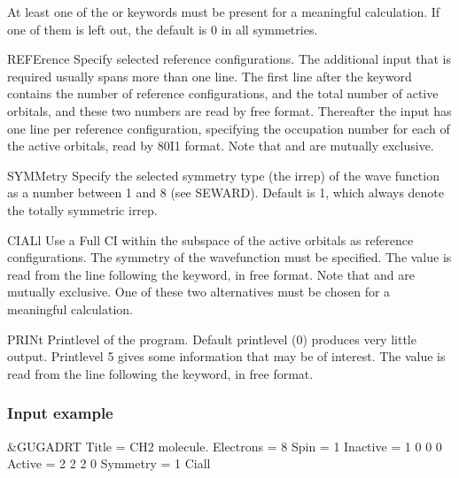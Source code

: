 \begin{keywordlist}
At least one of the  or  keywords must
be present for a meaningful calculation. If one of them is left out,
the default is 0 in all symmetries.
\item[REFErence]
Specify selected reference configurations. The additional input
that is required usually spans more than one line. The first line
after the keyword contains the number of reference configurations, and
the total number of active orbitals, and these two numbers are
read by free format. Thereafter the input has one line per
reference configuration, specifying the occupation number for each of
the active orbitals, read by 80I1 format. Note that
 and  are mutually exclusive.
\item[SYMMetry]
Specify the selected symmetry type (the irrep) of the wave function
as a number between 1 and 8 (see SEWARD). Default is 1, which
always denote the totally symmetric irrep.
\item[CIALl]
Use a Full CI within the subspace of the active orbitals as
reference configurations. The symmetry of the wavefunction must be
specified. The value is read from the line following the keyword, in
free format. Note that
 and  are mutually exclusive.
One of these two alternatives must be chosen for a meaningful calculation.
\item[PRINt]
Printlevel of the program. Default printlevel (0) produces very
little output. Printlevel 5 gives some information that may be of
interest. The value is read from the line following the keyword, in free
format.
\end{keywordlist}

\subsubsection{Input example}
\begin{inputlisting}
 &GUGADRT
Title     =  CH2 molecule.
Electrons =  8
Spin      =  1
Inactive  =  1    0    0    0
Active    =  2    2    2    0
Symmetry  =  1
Ciall
\end{inputlisting}
